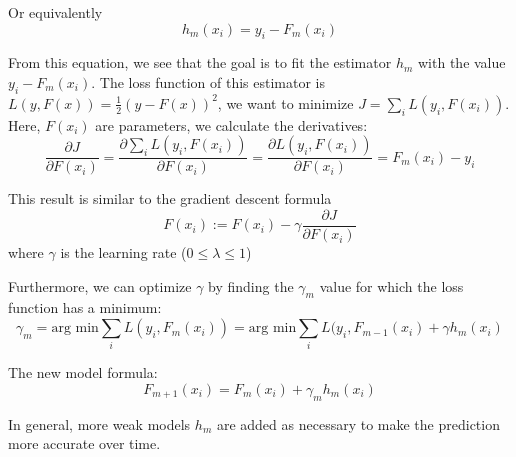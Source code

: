 \documentclass[a4paper, 12pt]{article}
\begin{document}
Or equivalently
\begin{equation}
    h_m(x_i) = y_i - F_m(x_i)
\end{equation}

From this equation, we see that the goal is to fit the estimator $h_m$ with the value $y_i - F_m(x_i)$. The loss function of this estimator is $L(y,F(x)) = \frac{1}{2}(y - F(x))^2$, we want to minimize $J = \sum_i L(y_i,F(x_i))$. Here, $F(x_i)$ are parameters, we calculate the derivatives:
\begin{equation}
    \frac{\partial J}{\partial F(x_i)} = \frac{\partial \sum_i L(y_i,F(x_i))}{\partial F(x_i)} = \frac{\partial L(y_i,F(x_i))}{\partial F(x_i)} =  F_m(x_i) - y_i
\end{equation}

This result is similar to the gradient descent formula
\begin{equation}
    F(x_i) := F(x_i) - \gamma \frac{\partial J}{\partial F(x_i)}
\end{equation}
where $\gamma$ is the learning rate ($0\leq\lambda\leq1$)

Furthermore, we can optimize $\gamma$ by finding the $\gamma_m$ value for which the loss function has a minimum:
\begin{equation}
    \gamma_m = \text{arg min} \sum_i L(y_i,F_m(x_i)) = \text{arg min} \sum_i L(y_i,F_{m-1}(x_i) + \gamma h_m(x_i)
\end{equation}

The new model formula:
\begin{equation}
    F_{m+1}(x_i) = F_m(x_i) + \gamma_m h_m(x_i)
\end{equation}

In general, more weak models $h_m$ are added as necessary to make the prediction more accurate over time.
\end{document}
